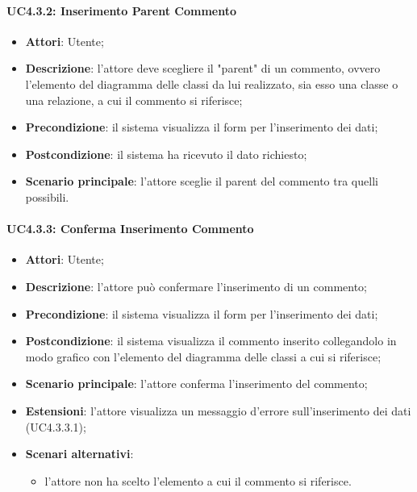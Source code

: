 \paragraph{UC4.3.2: Inserimento Parent Commento}
\label{UC4.3.2}
\begin{itemize}
\item \textbf{Attori}: Utente;
\item \textbf{Descrizione}: l'attore deve scegliere il "parent" di un commento, ovvero l'elemento del diagramma delle classi da lui realizzato, sia esso una classe o una relazione, a cui il commento si riferisce;
\item \textbf{Precondizione}: il sistema visualizza il form per l'inserimento dei dati;	
\item \textbf{Postcondizione}: il sistema ha ricevuto il dato richiesto;	
\item \textbf{Scenario principale}:
l'attore sceglie il parent del commento tra quelli possibili.
\end{itemize}

\paragraph{UC4.3.3: Conferma Inserimento Commento}
\label{UC4.3.3}
\begin{itemize}
\item \textbf{Attori}: Utente;
\item \textbf{Descrizione}: l'attore può confermare l'inserimento di un commento;	
\item \textbf{Precondizione}: il sistema visualizza il form per l'inserimento dei dati;	
\item \textbf{Postcondizione}: il sistema visualizza il commento inserito collegandolo in modo grafico con l'elemento del diagramma delle classi a cui si riferisce;	
\item \textbf{Scenario principale}:
l'attore conferma l'inserimento del commento;	
\item \textbf{Estensioni}:
l'attore visualizza un messaggio d'errore sull'inserimento dei dati (UC4.3.3.1);	
\item \textbf{Scenari alternativi}:
\begin{itemize}
\item l'attore non ha scelto l'elemento a cui il commento si riferisce.
\end{itemize}
\end{itemize}

